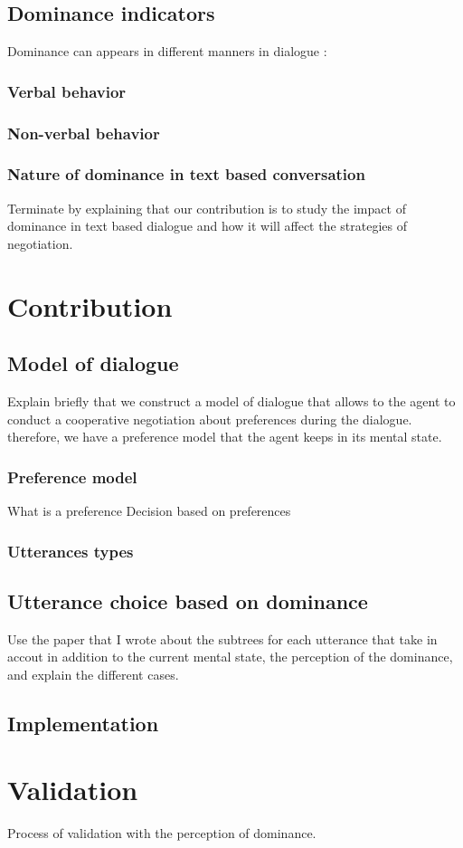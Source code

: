 \documentclass{llncs}
\begin{document}
\subsection{Dominance indicators}
Dominance can appears in different manners in dialogue :
\subsubsection{Verbal behavior}

\subsubsection{Non-verbal behavior}


\subsubsection{Nature of dominance in text based conversation}

Terminate by explaining that our contribution is to study the impact of dominance in text based dialogue and how it will affect the strategies of negotiation.


\section{Contribution}
	\subsection{Model of dialogue}
	Explain briefly that we construct a model of dialogue that allows to the agent to conduct a cooperative negotiation about preferences during the dialogue.
	therefore, we have a preference model that the agent keeps in its mental state. 
		\subsubsection{Preference model}
			What is a preference
			Decision based on preferences
				
		\subsubsection{Utterances types}
	
	\subsection{Utterance choice based on dominance}
		Use the paper that I wrote about the subtrees for each utterance that take in accout in addition to the current mental state, the perception of the dominance, and explain the different cases.
	
	\subsection{Implementation}		
\section{Validation}

Process of validation with the perception of dominance. 	
\vskip 4pt


\end{document}
